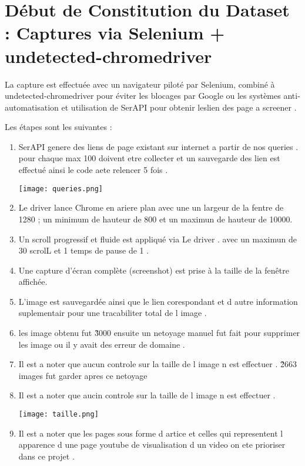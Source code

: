 \documentclass[12pt,a4paper]{report}
\begin{document}
\section{Début de Constitution du Dataset : Captures via Selenium + undetected-chromedriver}

La capture est effectuée avec un navigateur piloté par Selenium, combiné à undetected-chromedriver pour éviter les blocages par Google ou les systèmes anti-automatisation et utilisation de SerAPI pour obtenir leslien des page a screener .

Les étapes sont les suivantes :
\begin{enumerate}
\item SerAPI genere des liens de page existant sur internet a partir de nos queries . pour chaque  max 100 doivent etre collecter et un sauvegarde des lien est effectué ainsi le code aete relencer 5 fois .

\texttt{[image: queries.png]}

\item Le driver  lance Chrome en ariere plan  avec une un largeur de la fentre de 1280  ; un minimum de hauteur de 800 et un maximun de hauteur de 10000.
\item Un scroll progressif et fluide est appliqué via Le driver . avec un maximun de 30 scrolL et 1 temps de pause de 1 .
\item Une capture d'écran complète (screenshot) est prise à la taille de la fenêtre affichée.
\item L'image est sauvegardée ainsi que le lien corespondant et d autre information suplementair pour une tracabiliter total de l image .


\item les image obtenu fut \~ 3000 ensuite un netoyage manuel fut fait pour supprimer les image ou il y avait des erreur de domaine .

\item Il est a noter que aucun controle sur la taille de l image n est effectuer . \~ 2663 images fut garder apres ce netoyage

\item Il est a noter que aucin controle sur la taille de l image n est effectuer .

\texttt{[image: taille.png]}


\item Il est a noter que  les pages sous forme d artice et celles qui representent l apparence d une page youtube de visualisation d un video on ete prioriser dans ce projet .

\end{enumerate}
\end{document}

